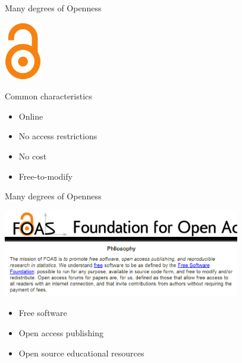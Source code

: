 
\begin{frame}{Many degrees of Openness}

\begin{multicols}{2}
\includegraphics[height = 1in]{OAlogo.png}

\columnbreak

\begin{block}{Common characteristics}
\begin{itemize}
	\item Online
\pause
	\item No access restrictions
\pause
	\item No cost
\pause
	\item Free-to-modify
\end{itemize}
\end{block}
\end{multicols}

\end{frame}


\begin{frame}{Many degrees of Openness}

\includegraphics[height = 1.5in]{FOAS.png}

\begin{itemize}
	\item Free software
\pause
	\item Open access publishing
\pause
	\item Open source educational resources
\end{itemize}

\end{frame}



